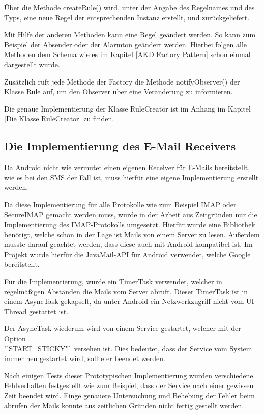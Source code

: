 \"Uber die Methode createRule() wird, unter der Angabe des Regelnames und des Typs, eine neue Regel der entsprechenden Instanz erstellt, und zur\"uckgeliefert.

Mit Hilfe der anderen Methoden kann eine Regel ge\"andert werden. So kann zum Beispiel der Absender oder der Alarmton ge\"andert werden. Hierbei folgen alle Methoden dem Schema wie es im Kapitel \ref{AKD Factory Pattern} schon einmal dargestellt wurde.
 

Zus\"atzlich ruft jede Methode der Factory die Methode notifyObserver() der Klasse Rule auf, um den Observer \"uber eine Ver\"anderung zu informieren.

Die genaue Implementierung der Klasse RuleCreator ist im Anhang im Kapitel \ref{Die Klasse RuleCreator} zu finden. 

\subsection{Die Implementierung des E-Mail Receivers}
Da Android nicht wie vermutet einen eigenen Receiver f\"ur E-Mails bereitstellt, wie es bei den SMS der Fall ist, muss hierf\"ur eine eigene Implementierung erstellt werden.

Da diese Implementierung f\"ur alle Protokolle wie zum Beispiel IMAP oder SecureIMAP gemacht werden muss, wurde in der Arbeit aus Zeitgr\"unden nur die Implementierung des IMAP-Protokolls umgesetzt. Hierf\"ur wurde eine Bibliothek ben\"otigt, welche schon in der Lage ist Mails von einem Server zu lesen. Au\ss{}erdem musste darauf geachtet werden, dass diese auch mit Android kompatibel ist. Im Projekt wurde hierf\"ur die JavaMail-API f\"ur Android verwendet, welche Google bereitstellt. \cite{MailAPI}

F\"ur die Implementierung, wurde ein TimerTask verwendet, welcher in regelm\"a\ss{}igen Abst\"anden die Mails vom Server abruft. Dieser TimerTask ist in einem AsyncTask gekapselt, da unter Android ein Netzwerkzugriff nicht vom UI-Thread gestattet ist. 

Der AsyncTask wiederum wird von einem Service gestartet, welcher mit der Option \\"'START\_STICKY"` versehen ist. Dies bedeutet, dass der Service vom System immer neu gestartet wird, sollte er beendet werden.

Nach einigen Tests dieser Prototypischen Implementierung wurden verschiedene Fehlverhalten festgestellt wie zum Beispiel, dass der Service nach einer gewissen Zeit beendet wird.
Einge genauere Untersuchung und Behebung der Fehler beim abrufen der Mails konnte aus zeitlichen Gr\"unden nicht fertig gestellt werden.

